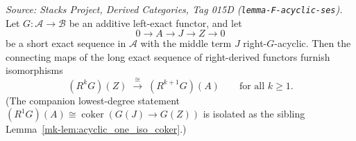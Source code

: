 \begin{lemma}\label{mk-lem:acyclic_dimension_shift}
  \leanok

  \textit{Source: Stacks Project, Derived Categories, Tag 015D
  (\texttt{lemma-F-acyclic-ses}).}
  Let \(G : \mathcal{A} \to \mathcal{B}\) be an additive left-exact functor, and let
  \[
    0 \longrightarrow A \longrightarrow J \longrightarrow Z \longrightarrow 0
  \]
  be a short exact sequence in \(\mathcal{A}\) with the middle term \(J\)
  right-\(G\)-acyclic. Then the connecting maps of the long exact sequence of
  right-derived functors furnish isomorphisms
  \[
    (R^{k} G)(Z) \;\xrightarrow{\ \cong\ }\; (R^{k+1} G)(A)
    \qquad \text{for all } k \geq 1.
  \]
  (The companion lowest-degree statement
  \((R^{1} G)(A) \cong \operatorname{coker}(G(J) \to G(Z))\) is isolated as the
  sibling Lemma~\ref{mk-lem:acyclic_one_iso_coker}.)
\end{lemma}
